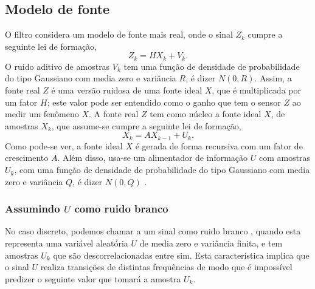 \documentclass[a4paper,10pt]{article}
\begin{document}
\subsection{Modelo de fonte}\label{subsec:modelfonte}
O filtro considera um modelo de fonte mais real,  onde o sinal $Z_k$
cumpre a seguinte lei de formação,
\begin{equation} \label{eq:p2}
 Z_k=H X_k +V_k.
\end{equation}
O ruido aditivo de amostras $V_k$ tem uma função de densidade de probabilidade 
do tipo Gaussiano com media zero e variância $R$, é dizer $N(0,R)$.
Assim, a fonte real $Z$ é uma versão ruidosa de uma fonte ideal $X$, que é
multiplicada por um fator $H$; este valor pode ser entendido como o ganho que tem o
sensor $Z$ ao medir um fenômeno $X$.
 A fonte real $Z$ 
tem como núcleo a fonte ideal $X$, de amostras $X_k$, que assume-se cumpre a seguinte lei de formação,
\begin{equation} \label{eq:p1}
 X_k=A X_{k-1} +U_k.
\end{equation}
Como pode-se ver, a fonte ideal $X$ é gerada de forma recursiva com um fator de crescimento $A$. 
Além disso, usa-se um alimentador de informação $U$ com amostras $U_k$, 
com uma função de densidade de probabilidade  do tipo Gaussiano 
com media zero e variância $Q$, é dizer $N(0,Q)$ \cite{caractU}.

\subsubsection{Assumindo $U$ como ruido branco}\label{subsubsection:memless}
No caso discreto, podemos chamar a um sinal como ruido branco \cite{ruidob}, quando esta representa  uma variável 
aleatória $U$ de media zero e variância finita, e tem amostras $U_k$ 
que são descorrelacionadas entre sim.
Esta característica implica que o sinal $U$ realiza transições de distintas frequências
de modo que é impossível predizer o seguinte valor  que tomará a amostra $U_k$.
\end{document}
